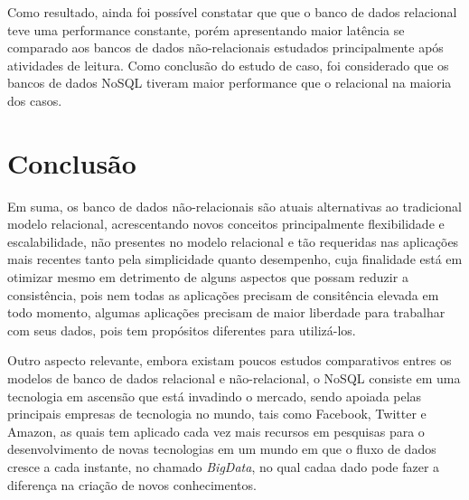 \documentclass[12pt]{article}
\begin{document}
Como resultado, ainda foi possível constatar que que o banco de dados relacional teve uma performance constante, porém apresentando maior latência se comparado aos bancos de dados não-relacionais estudados principalmente após atividades de leitura. Como conclusão do estudo de caso, foi considerado que os bancos de dados NoSQL tiveram maior performance que o relacional na maioria dos casos.

\section{Conclusão}
\label{sec:conclusao}

Em suma, os banco de dados não-relacionais são atuais alternativas ao tradicional modelo relacional, acrescentando novos conceitos principalmente flexibilidade e escalabilidade, não presentes no modelo relacional e tão requeridas nas aplicações mais recentes tanto pela simplicidade quanto desempenho, cuja finalidade está em otimizar mesmo em detrimento de alguns aspectos que possam reduzir a consistência, pois nem todas as aplicações precisam de consitência elevada em todo momento, algumas aplicações precisam de maior liberdade para trabalhar com seus dados, pois tem propósitos diferentes para utilizá-los.

Outro aspecto relevante, embora existam poucos estudos comparativos entres os modelos de banco de dados relacional e não-relacional, o NoSQL consiste em uma tecnologia em ascensão que está invadindo o mercado, sendo apoiada pelas principais empresas de tecnologia no mundo, tais como Facebook, Twitter e Amazon, as quais tem aplicado cada vez mais recursos em pesquisas para o desenvolvimento de novas tecnologias em um mundo em que o fluxo de dados cresce a cada instante, no chamado \textit{BigData}, no qual cadaa dado pode fazer a diferença na criação de novos conhecimentos.



\end{document}
